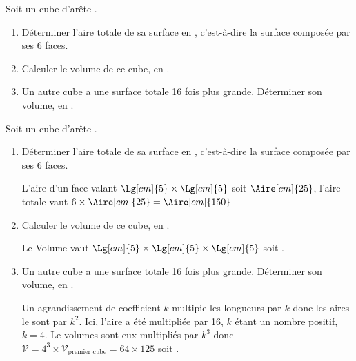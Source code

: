 \begin{exercice*}
    Soit un cube d'arête .
    \begin{enumerate}
        \item Déterminer l'aire totale de sa surface en \Aire[cm]{}, c'est-à-dire la surface composée par ses 6 faces.
        \item Calculer le volume de ce cube, en \Vol[cm]{}.
        \item Un autre cube a une surface totale 16 fois plus grande. Déterminer son volume, en \Vol[cm]{}.
    \end{enumerate}    
\end{exercice*}
\begin{corrige}
    Soit un cube d'arête .
    \begin{enumerate}
        \item Déterminer l'aire totale de sa surface en \Aire[cm]{}, c'est-à-dire la surface composée par ses 6 faces.
        
        {\color{red}L'aire d'un face valant $\Lg[cm]{5}\times\Lg[cm]{5}$ soit $\Aire[cm]{25}$, l'aire totale vaut $6\times\Aire[cm]{25}=\Aire[cm]{150}$}
        \item Calculer le volume de ce cube, en \Vol[cm]{}.
        
        {\color{red}Le Volume vaut $\Lg[cm]{5}\times\Lg[cm]{5}\times\Lg[cm]{5}$ soit .}
        \item Un autre cube a une surface totale 16 fois plus grande. Déterminer son volume, en \Vol[cm]{}.
        
        {\color{red}Un agrandissement de coefficient $k$ multipie les longueurs par $k$ donc les aires le sont par $k^2$.
        Ici, l'aire a été multipliée par 16, $k$ étant un nombre positif, $k=4$. Le volumes sont eux multipliés par $k^3$ donc $\mathcal{V}=4^3\times\mathcal{V}_{\text{premier cube}}=64\times 125$ soit .}
    \end{enumerate}
\end{corrige}
